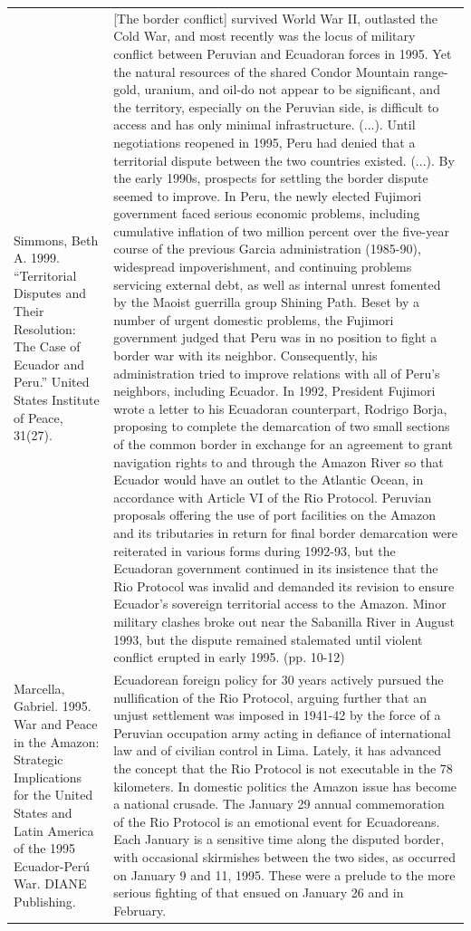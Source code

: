 {\begin{longtable}{p{}p{}}
\\
Simmons, Beth A. 1999. “Territorial Disputes and Their Resolution: The Case of Ecuador and Peru.” United States Institute of Peace, 31(27). & [The border conflict] survived World War II, outlasted the Cold War, and most recently was the locus of military conflict between Peruvian and Ecuadoran forces in 1995. Yet the natural resources of the shared Condor Mountain range-gold, uranium, and oil-do not appear to be significant, and the territory, especially on the Peruvian side, is difficult to access and has only minimal infrastructure. (...). Until negotiations reopened in 1995, Peru had denied that a territorial dispute between the two countries existed. (...). By the early 1990s, prospects for settling the border dispute seemed to improve. In Peru, the newly elected Fujimori government faced serious economic problems, including cumulative inflation of two million percent over the five-year course of the previous Garcia administration (1985-90), widespread impoverishment, and continuing problems servicing external debt, as well as internal unrest fomented by the Maoist guerrilla group Shining Path. Beset by a number of urgent domestic problems, the Fujimori government judged that Peru was in no position to fight a border war with its neighbor. Consequently, his administration tried to improve relations with all of Peru's neighbors, including Ecuador. In 1992, President Fujimori wrote a letter to his Ecuadoran counterpart, Rodrigo Borja, proposing to complete the demarcation of two small sections of the common border in exchange for an agreement to grant navigation rights to and through the Amazon River so that Ecuador would have an outlet to the Atlantic Ocean, in accordance with Article VI of the Rio Protocol. Peruvian proposals offering the use of port facilities on the Amazon and its tributaries in return for final border demarcation were reiterated in various forms during 1992-93, but the Ecuadoran government continued in its insistence that the Rio Protocol was invalid and demanded its revision to ensure Ecuador's sovereign territorial access to the Amazon. Minor military clashes broke out near the Sabanilla River in August 1993, but the dispute remained stalemated until violent conflict erupted in early 1995.  (pp. 10-12)
\\
Marcella, Gabriel. 1995. War and Peace in the Amazon: Strategic Implications for the United States and Latin America of the 1995 Ecuador-Perú War. DIANE Publishing. & Ecuadorean foreign policy for 30 years actively pursued the nullification of the Rio Protocol, arguing further that an unjust settlement was imposed in 1941-42 by the force of a Peruvian occupation army acting in defiance of international law and of civilian control in Lima. Lately, it has advanced the concept that the Rio Protocol is not executable in the 78 kilometers. In domestic politics the Amazon issue has become a national crusade. The January 29 annual commemoration of the Rio Protocol is an emotional event for Ecuadoreans. Each January is a sensitive time along the disputed border, with occasional skirmishes between the two sides, as occurred on January 9 and 11, 1995. These were a prelude to the more serious fighting of that ensued on January 26 and in February.

\end{longtable}}
